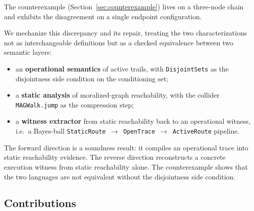 \documentclass[acmsmall,screen,review,anonymous,nonacm]{acmart}
\newcommand{\lean}[1]{\lstinline!#1!}
\begin{document}
The counterexample (Section~\ref{sec:counterexample}) lives on a
three-node chain and exhibits the disagreement on a single endpoint
configuration.

We mechanize this discrepancy and its repair, treating the two
characterizations not as interchangeable definitions but as a checked
equivalence between two semantic layers:
\begin{itemize}
  \item an \textbf{operational semantics} of active trails, with
    \lean{DisjointSets} as the disjointness side condition on the
    conditioning set;
  \item a \textbf{static analysis} of moralized-graph reachability, with the
    collider \lean{MAGWalk.jump} as the compression step;
  \item a \textbf{witness extractor} from static reachability back to an
    operational witness, i.e.\ a Bayes-ball
    \lean{StaticRoute}~$\to$~\lean{OpenTrace}~$\to$~\lean{ActiveRoute}
    pipeline.
\end{itemize}
The forward direction is a soundness result: it compiles an operational trace
into static reachability evidence.  The reverse direction reconstructs a
concrete execution witness from static reachability alone.  The counterexample
shows that the two languages are not equivalent without the disjointness
side condition.

\subsection{Contributions}
\end{document}
